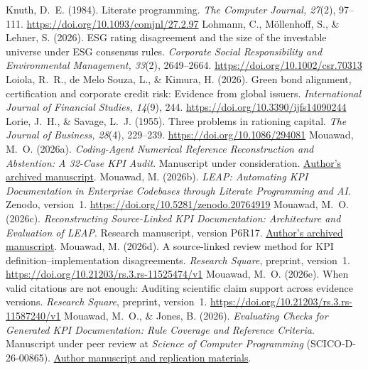 \begin{thebibliography}{}
 Knuth, D.~E. (1984). Literate programming. \emph{The Computer Journal, 27}(2), 97--111. \url{https://doi.org/10.1093/comjnl/27.2.97}
 Lohmann, C., Möllenhoff, S., \& Lehner, S. (2026). ESG rating disagreement and the size of the investable universe under ESG consensus rules. \emph{Corporate Social Responsibility and Environmental Management, 33}(2), 2649--2664. \url{https://doi.org/10.1002/csr.70313}
 Loiola, R.~R., de Melo Souza, L., \& Kimura, H. (2026). Green bond alignment, certification and corporate credit risk: Evidence from global issuers. \emph{International Journal of Financial Studies, 14}(9), 244. \url{https://doi.org/10.3390/ijfs14090244}
 Lorie, J.~H., \& Savage, L.~J. (1955). Three problems in rationing capital. \emph{The Journal of Business, 28}(4), 229--239. \url{https://doi.org/10.1086/294081}
 Mouawad, M.~O. (2026a). \emph{Coding-Agent Numerical Reference Reconstruction and Abstention: A 32-Case KPI Audit}. Manuscript under consideration. \href{https://github.com/Meshaal-Mouawad/LEAP-Paper5-KPI-Conformance/blob/51ca9431bdd879cc86a5065463b62f6c9e5deabc/manuscript/LEAP_Paper5_C29_Manuscript.pdf}{Author's archived manuscript}.
 Mouawad, M. (2026b). \emph{LEAP: Automating KPI Documentation in Enterprise Codebases through Literate Programming and AI}. Zenodo, version~1. \url{https://doi.org/10.5281/zenodo.20764919}
 Mouawad, M.~O. (2026c). \emph{Reconstructing Source-Linked KPI Documentation: Architecture and Evaluation of LEAP}. Research manuscript, version P6R17. \href{https://github.com/Meshaal-Mouawad/LEAP-Paper1-Evidence/blob/a20b243683a262fd43987013117120c313ec8fa8/SCP_P6R17/01_Manuscript_SCP_P6R17.pdf}{Author's archived manuscript}.
 Mouawad, M. (2026d). A source-linked review method for KPI definition--implementation disagreements. \emph{Research Square}, preprint, version~1. \url{https://doi.org/10.21203/rs.3.rs-11525474/v1}
 Mouawad, M.~O. (2026e). When valid citations are not enough: Auditing scientific claim support across evidence versions. \emph{Research Square}, preprint, version~1. \url{https://doi.org/10.21203/rs.3.rs-11587240/v1}
 Mouawad, M.~O., \& Jones, B. (2026). \emph{Evaluating Checks for Generated KPI Documentation: Rule Coverage and Reference Criteria}. Manuscript under peer review at \emph{Science of Computer Programming} (SCICO-D-26-00865). \href{https://github.com/Meshaal-Mouawad/Paper_2_JSS/blob/1fe7d8c1efe0e90b036f81ae319fbcffb80a262a/main.pdf}{Author manuscript and replication materials}.

\end{thebibliography}
